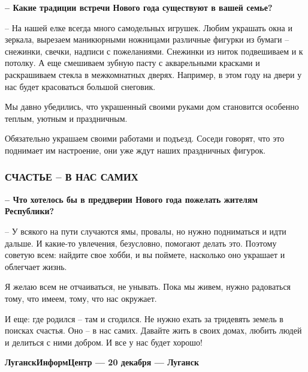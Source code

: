 \textbf{– Какие традиции встречи Нового года существуют в вашей семье?}

– На нашей елке всегда много самодельных игрушек. Любим украшать окна и
зеркала, вырезаем маникюрными ножницами различные фигурки из бумаги – снежинки,
свечки, надписи с пожеланиями. Снежинки из ниток подвешиваем и к потолку. А еще
смешиваем зубную пасту с акварельными красками и раскрашиваем стекла в
межкомнатных дверях. Например, в этом году на двери у нас будет красоваться
большой снеговик.

Мы давно убедились, что украшенный своими руками дом становится особенно
теплым, уютным и праздничным.

Обязательно украшаем своими работами и подъезд. Соседи говорят, что это
поднимает им настроение, они уже ждут наших праздничных фигурок.

\subsubsection{СЧАСТЬЕ – В НАС САМИХ}

\textbf{– Что хотелось бы в преддверии Нового года пожелать жителям Республики?}

– У всякого на пути случаются ямы, провалы, но нужно подниматься и идти дальше.
И какие-то увлечения, безусловно, помогают делать это. Поэтому советую всем:
найдите свое хобби, и вы поймете, насколько оно украшает и облегчает жизнь.

Я желаю всем не отчаиваться, не унывать. Пока мы живем, нужно радоваться тому,
что имеем, тому, что нас окружает.     

И еще: где родился – там и сгодился. Не нужно ехать за тридевять земель в
поисках счастья. Оно – в нас самих. Давайте жить в своих домах, любить людей и
делиться с ними добром. И все у нас будет хорошо! 

\textbf{ЛуганскИнформЦентр — 20 декабря — Луганск}


